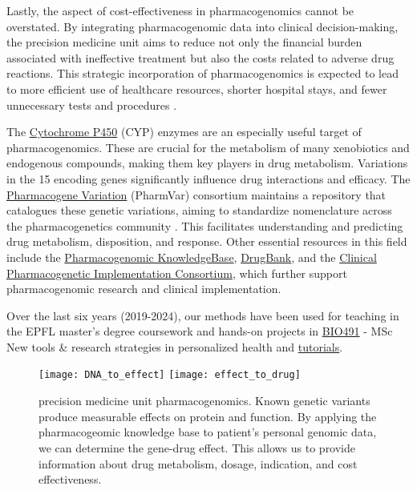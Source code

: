 Lastly, the aspect of cost-effectiveness in pharmacogenomics cannot be overstated. By integrating pharmacogenomic data into clinical decision-making, the precision medicine unit aims to reduce not only the financial burden associated with ineffective treatment but also the costs related to adverse drug reactions. 
This strategic incorporation of pharmacogenomics is expected to lead to more efficient use of healthcare resources, shorter hospital stays, and fewer unnecessary tests and procedures \citep{relling2015pharmacogenomics}.

The \href{https://en.wikipedia.org/wiki/Cytochrome_P450}{Cytochrome P450} (CYP) enzymes are an especially useful target of pharmacogenomics.
These are crucial for the metabolism of many xenobiotics and endogenous compounds, making them key players in drug metabolism. 
Variations in the 15 encoding genes significantly influence drug interactions and efficacy. 
The \href{https://www.pharmvar.org}{Pharmacogene Variation} (PharmVar) consortium maintains a repository that catalogues these genetic variations, aiming to standardize nomenclature across the pharmacogenetics community
\citep{gaedigk2021pharmvar}. 
This facilitates understanding and predicting drug metabolism, disposition, and response. 
Other essential resources in this field include the 
\href{https://www.pharmgkb.org/}{Pharmacogenomic KnowledgeBase}, 
\href{https://go.drugbank.com}{DrugBank}, and 
the \href{https://cpicpgx.org/}{Clinical Pharmacogenetic Implementation Consortium}, which further support pharmacogenomic research and clinical implementation.

Over the last six years (2019-2024), our methods have been used for teaching in the EPFL master's degree coursework and hands-on projects in 
\href{https://edu.epfl.ch/coursebook/en/new-tools-research-strategies-in-personalized-health-BIO-491?cb_cycle=bama_cyclemaster&cb_section=sv}{BIO491} - MSc New tools \& research strategies in personalized health and 
\href{https://lawlessgenomics.com/topic/pharmacogenomics}{tutorials}.

\begin{figure}[h] \hspace*{-5cm} 
\begin{center}
	\texttt{[image: DNA\_to\_effect]}
	\texttt{[image: effect\_to\_drug]}
	\caption{precision medicine unit pharmacogenomics. Known genetic variants produce measurable effects on protein and function. By applying the pharmacogeomic knowledge base to patient's personal genomic data, we can determine the gene-drug effect. This allows us to provide information about drug metabolism, dosage, indication, and cost effectiveness.}
	\label{fig:pharmacogenomic}
\end{center}
\end{figure}


